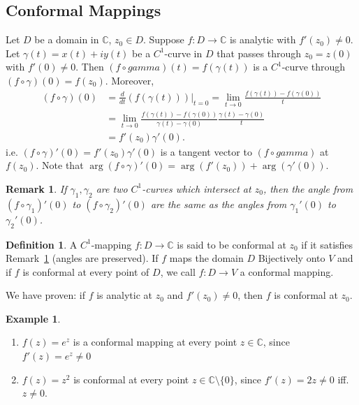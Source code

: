 \documentclass[12pt, a4paper]{article}
\theoremstyle{plain}
\newtheorem{rem}{Remark}
\theoremstyle{definition}
\newtheorem{definition}{Definition} %
\newtheorem{example}{Example} %
\begin{document}
		\subsection{Conformal Mappings} %
		\label{sub:conformal_mappings}
			Let $D$ be a domain in $\mathbb{C}$, $z_0\in D$. Suppose $f:D\to \mathbb{C}$ is analytic with $f'(z_0)\not=0$. Let $\gamma(t) = x(t) + iy(t)$ be a $C^1$-curve in $D$ that passes through $z_0 = z(0)$ with $f'(0)\not=0$. Then $(f\circ gamma)(t) = f(\gamma(t))$ is a $C^1$-curve through $(f\circ \gamma)(0) = f(z_0)$. Moreover,
			\begin{align*}
				(f\circ \gamma)(0) &= 
				\frac{d}{dt}(f(\gamma(t)))|_{t=0} = 
				\lim\limits_{t\to 0}\frac{f(\gamma(t))-f(\gamma(0))}{t} \\ &=
				\lim\limits_{t\to 0}\frac{f(\gamma(t))-f(\gamma(0))}{\gamma(t)-\gamma(0)}\frac{\gamma(t)-\gamma(0)}{t}\\ &=
				f'(z_0)\gamma'(0).
			\end{align*}
			i.e. $(f\circ \gamma)'(0) = f'(z_0)\gamma'(0)$ is a tangent vector to $(f\circ gamma)$ at $f(z_0)$. Note that $\arg(f\circ \gamma)'(0) = \arg(f'(z_0))+\arg(\gamma'(0))$.\\

			\begin{rem}
			\label{rem:conformality}
				If $\gamma_1,\gamma_2$ are two $C^1$-curves which intersect at $z_0$, then the angle from $(f\circ \gamma_1)'(0)$ to $(f\circ \gamma_2)'(0)$ are the same as the angles from $\gamma_1'(0)$ to $\gamma_2'(0)$.\\
			\end{rem}

			\begin{definition}
				A $C^1$-mapping $f:D\to \mathbb{C}$ is said to be conformal at $z_0$ if it satisfies Remark~\ref{rem:conformality} (angles are preserved). If $f$ maps the domain $D$ Bijectively onto $V$ and if $f$ is conformal at every point of $D$, we call $f:D\to V$ a conformal mapping.\\
			\end{definition}

			We have proven: if $f$ is analytic at $z_0$ and $f'(z_0)\not = 0$, then $f$ is conformal at $z_0$.

			\begin{example}
				\begin{enumerate}
					\item $f(z)=e^z$ is a conformal mapping at every point $z\in \mathbb{C}$, since $f'(z) = e^z \not = 0$
					\item $f(z) = z^2$ is conformal at every point $z\in \mathbb{C}\setminus\{0\}$, since $f'(z) = 2z\not=0$ iff. $z\not=0$.
				\end{enumerate}
			\end{example}
\end{document}
